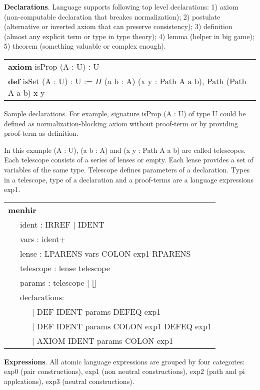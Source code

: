 \documentclass[a4paper,UKenglish,cleveref, autoref, thm-restate]{lipics-v2021}
\newcommand{\tabstyle}[0]{\scriptsize\ttfamily\fontseries{l}\selectfont}
\begin{document}
\textbf{Declarations}. Language supports following top level declarations:
1) axiom (non-computable declaration that breakes normalization);
2) postulate (alternative or inverted axiom that can preserve consistency);
3) definition (almost any explicit term or type in type theory);
4) lemma (helper in big game);
5) theorem (something valuable or complex enough).


\begin{table}[ht!]
\tabstyle
\begin{tabular}{l}
\textbf{axiom} isProp (A : U) : U \\
\textbf{def} isSet (A : U) : U := \textbf{$\Pi$} (a b : A) (x y : Path A a b), Path (Path A a b) x y
\end{tabular}
\end{table}

Sample declarations. For example, signature isProp (A : U) of type U could be
defined as normalization-blocking axiom without proof-term or by providing proof-term as definition.

In this example (A : U), (a b : A) and (x y : Path A a b) are called telescopes.
Each telescope consists of a series of lenses or empty. Each lense provides a
set of variables of the same type. Telescope defines parameters of a declaration.
Types in a telescope, type of a declaration and a proof-terms are a language expressions exp1.

\begin{table}[ht]
\tabstyle
\begin{tabular}{l}
\textbf{menhir} \\
\ \ \ ident : IRREF | IDENT \\
\ \ \ vars : ident+ \\
\ \ \ lense : LPARENS vars COLON exp1 RPARENS \\
\ \ \ telescope : lense telescope \\
\ \ \ params : telescope | [] \\
\ \ \ declarations: \\
\ \ \ \ \ \ | DEF IDENT params DEFEQ exp1 \\
\ \ \ \ \ \ | DEF IDENT params COLON exp1 DEFEQ exp1 \\
\ \ \ \ \ \ | AXIOM IDENT params COLON exp1
\end{tabular}
\end{table}

\textbf{Expressions}. All atomic language expressions are grouped by four categories:
exp0 (pair constructions), exp1 (non neutral constructions), exp2 (path and pi applcations),
exp3 (neutral constructions).
\end{document}
